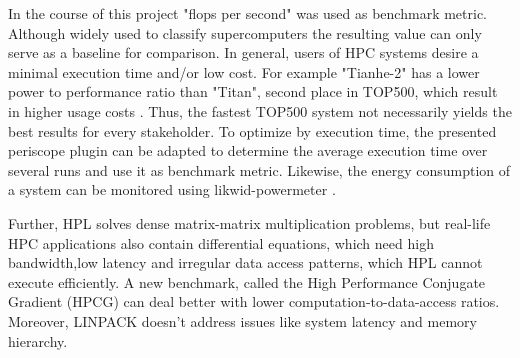 \documentclass[10pt,twocolumn]{article}
\begin{document}
In the course of this project "flops per second" was used as benchmark metric. Although widely used to classify supercomputers the resulting value can only serve as a baseline for comparison. In general, users of HPC systems desire a minimal execution time and/or low cost. For example "Tianhe-2" has a lower power to performance ratio than "Titan", second place in TOP500, which result in higher usage costs \cite{top500}. Thus, the fastest TOP500 system not necessarily yields the best results for every stakeholder. To optimize by execution time, the presented periscope plugin can be adapted to determine the average execution time over several runs and use it as benchmark metric. Likewise, the energy consumption of a system can be monitored using likwid-powermeter \cite{likwidLRZ,likwidPowermeter}.

Further, HPL solves dense matrix-matrix multiplication problems, but real-life HPC applications also contain differential equations, which need high bandwidth,low latency and irregular data access patterns, which HPL cannot execute efficiently. A new benchmark, called the High Performance Conjugate Gradient (HPCG) can deal better with lower computation-to-data-access ratios\cite{betterLinpack}. Moreover, LINPACK doesn't address issues like system latency and memory hierarchy. 
\end{document}
